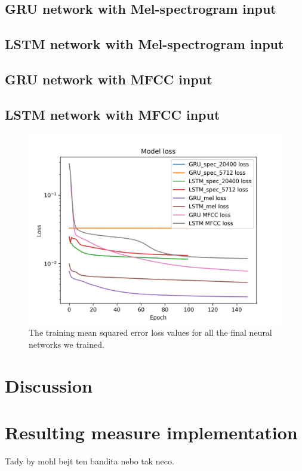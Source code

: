 \subsection{GRU network with Mel-spectrogram input}
\subsection{LSTM network with Mel-spectrogram input}
\subsection{GRU network with MFCC input}
\subsection{LSTM network with MFCC input}

\begin{figure}[h]
    \centering
	\includegraphics[width=120mm]{./img/all_training_graphs.png}
	\caption{The training mean squared error loss values for all the final neural networks we trained.}
	\label{fig:all_model_training}
\end{figure}


\section{Discussion}\label{sec:discussion}

\section{Resulting measure implementation}
Tady by mohl bejt ten bandita nebo tak neco.